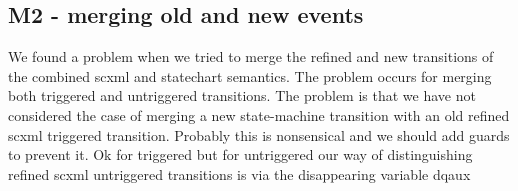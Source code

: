 \subsection{M2 - merging old and new events}
We found a problem when we tried to merge the refined and new  transitions of the combined scxml and statechart semantics. 
The problem occurs for merging both triggered and untriggered transitions.
The problem is that we have not considered the case of merging a new state-machine transition with an old refined scxml triggered transition.
Probably this is nonsensical and we should add guards to prevent it.
Ok for triggered but for untriggered our way of distinguishing refined scxml untriggered transitions is via the disappearing variable dqaux
